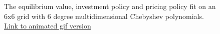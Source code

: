 \documentclass[12pt]{article}
\begin{document}
\begin{figure}[H]
  \centering
  \caption{The equilibrium value, investment policy and pricing policy fit on an 6x6 grid with 6 degree multidimensional Chebyshev polynomials. \href{https://github.com/wmjones/VFA-for-dynamic-games/blob/master/gifs/gif_cai_6_6.gif}{Link to animated gif version}}
  \label{gibbsmore}
\end{figure}
\end{document}
